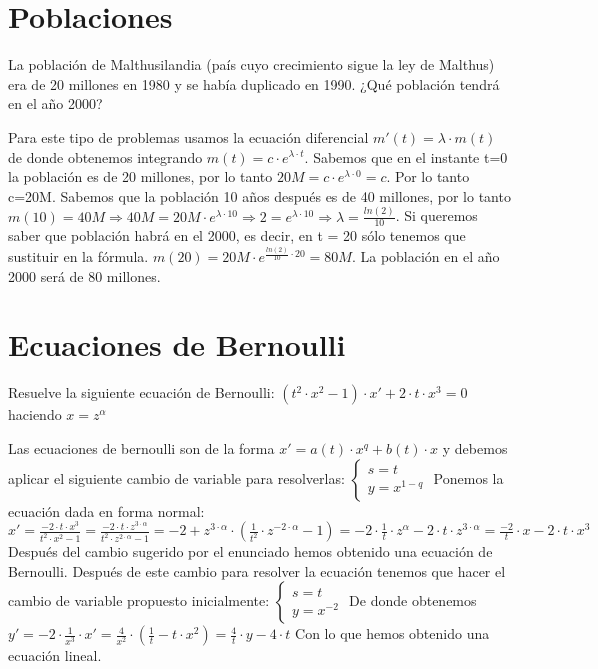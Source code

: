
\section{Poblaciones}
\begin{ejer}
	La población de Malthusilandia (país cuyo crecimiento sigue la ley de Malthus) era de 20 millones en 1980 y se había duplicado en 1990. ¿Qué población tendrá en el año 2000?
\end{ejer}
\begin{sol}
	Para este tipo de problemas usamos la ecuación diferencial $m'(t) = \lambda \cdot m(t)$ de donde obtenemos integrando $m(t) = c\cdot e^{\lambda \cdot t}$.  
	Sabemos que en el instante t=0 la población es de 20 millones, por lo tanto $20M = c\cdot e^{\lambda \cdot 0} = c$. Por lo tanto c=20M.  
	Sabemos que la población 10 años después es de 40 millones, por lo tanto $m(10) = 40M \Rightarrow 40M = 20M \cdot e^{\lambda \cdot 10} \Rightarrow 2 = e^{\lambda \cdot 10} \Rightarrow \lambda = \frac{ln(2)}{10}$.  
	Si queremos saber que población habrá en el 2000, es decir, en t = 20 sólo tenemos que sustituir en la fórmula.  
	$m(20) = 20M\cdot e^{\frac{ln(2)}{10}\cdot 20} = 80M$.  
	La población en el año 2000 será de 80 millones.
\end{sol}


\section{Ecuaciones de Bernoulli}
\begin{ejer}
	Resuelve la siguiente ecuación de Bernoulli: $(t^2\cdot x^2-1)\cdot x' + 2\cdot t\cdot x^3=0$ haciendo $x=z^\alpha$
\end{ejer}
\begin{sol}
	Las ecuaciones de bernoulli son de la forma $x' = a(t)\cdot x^q + b(t)\cdot x$ y debemos aplicar el siguiente cambio de variable para resolverlas:  
	$\begin{cases}
	s=t \\
	y=x^{1-q}
	\end{cases}$  
	Ponemos la ecuación dada en forma normal:  
	$x' = \frac{-2\cdot t\cdot x^3}{t^2\cdot x^2-1} = \frac{-2\cdot t\cdot z^{3\cdot \alpha}}{t^2\cdot z^{2\cdot \alpha}-1} = -2+z^{3\cdot \alpha}\cdot (\frac{1}{t^2}\cdot z^{-2\cdot \alpha}-1) = -2\cdot \frac{1}{t}\cdot z^{\alpha} - 2\cdot t\cdot z^{3\cdot \alpha} = \frac{-2}{t}\cdot x -2\cdot t\cdot x^3$  
	Después del cambio sugerido por el enunciado hemos obtenido una ecuación de Bernoulli.  
	Después de este cambio para resolver la ecuación tenemos que hacer el cambio de variable propuesto inicialmente:  
	$\begin{cases}
	s = t \\
	y = x^{-2}
	\end{cases}$  
	De donde obtenemos $y' = -2\cdot \frac{1}{x^3}\cdot x' = \frac{4}{x^2}\cdot (\frac{1}{t}-t\cdot x^2) = \frac{4}{t}\cdot y - 4\cdot t$  
	Con lo que hemos obtenido una ecuación lineal.
\end{sol}

